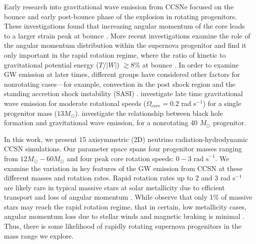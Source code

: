 \documentclass[twocolumn,times]{aastex62}  %
\begin{document}
Early research into gravitational wave emission from CCSNe focused on the bounce and early post-bounce phase of the explosion in rotating progenitors.
These investigations found that increasing angular momentum of the core leads to a larger strain peak at bounce \citep{muller:1982,moench:1991,yamada:1995,zwerger:1997,dimm:2002,kotake:2003,shibata:2004}.  
More recent investigations examine the role of the angular momentum distribution within the supernova progenitor and find it only important in the rapid rotation regime, where the ratio of kinetic to gravitational potential energy ($T/|W|$) $ \gtrsim 8\%$ at bounce \citep{abdik:2014}. In order to examine GW emission at later times, different groups have considered other factors for nonrotating cases---for example, convection in the post shock region \citep{burrows:1996,muller:1997,muller:2004,murphy:2009,marek:2009b} and the standing accretion shock instability (SASI) \citep{blondin:2003,blondin:2006,ohnishi:2006,foglizzo:2007,scheck:2008,iwakami:2009,fernandez:2010}.  \citet{moro:2018} investigate late time gravitational wave emission for moderate rotational speeds ($\Omega_{core} = 0.2$ rad s$^{-1}$) for a single progenitor mass ($13 M_\odot$).  \citet{pan:2018} investigate the relationship between black hole formation and gravitational wave emission, for a nonrotating 40 $M_\odot$ progenitor.
 

In this work, we present 15 axisymmetric (2D) neutrino radiation-hydrodynamic CCSN simulations.  
Our parameter space spans four progenitor masses ranging from $12M_\odot-60M_\odot$ \citep{Suk:2016} and four peak core rotation speeds: $0-3 \text{ rad s}^{-1}$.  
We examine the variation in key features of the GW emission from CCSN at these different masses and rotation rates.
Rapid rotation rates up to 2 and 3 rad s$^{-1}$ are likely rare in typical massive stars at solar metallicity due to efficient transport and loss of angular momentum \citep{heger:2005}.
While \citet{woosley:2006} observe that only 1\% of massive stars may reach the rapid rotation regime, that in certain, low metallicity cases, angular momentum loss due to stellar winds and magnetic braking is minimal \citep{yoon:2005}.  Thus, there is some likelihood of rapidly rotating supernova progenitors in the mass range we explore.  


\end{document}
